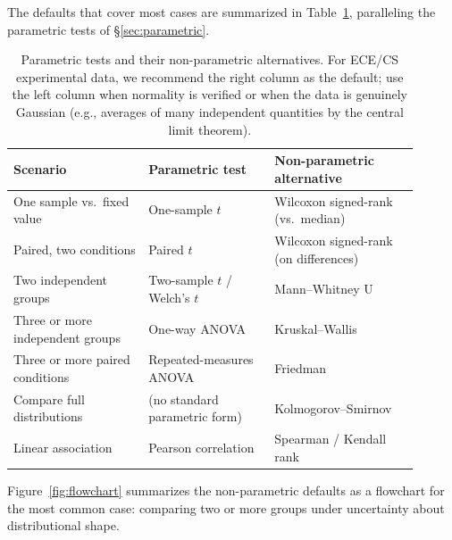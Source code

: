 \documentclass[11pt]{article}
\begin{document}
The defaults that cover most cases are summarized in Table~\ref{tab:tests}, paralleling the parametric tests of \S\ref{sec:parametric}.

\begin{table}[h]
\centering
\footnotesize
\setlength{\tabcolsep}{4pt}
\begin{tabular}{p{0.30\linewidth}p{0.28\linewidth}p{0.32\linewidth}}
\toprule
Scenario & Parametric test & Non-parametric alternative \\
\midrule
One sample vs.\ fixed value & One-sample $t$ & Wilcoxon signed-rank (vs.\ median) \\
Paired, two conditions & Paired $t$ & Wilcoxon signed-rank (on differences) \\
Two independent groups & Two-sample $t$ / Welch's $t$ & Mann--Whitney U \\
Three or more independent groups & One-way ANOVA & Kruskal--Wallis \\
Three or more paired conditions & Repeated-measures ANOVA & Friedman \\
Compare full distributions & (no standard parametric form) & Kolmogorov--Smirnov \\
Linear association & Pearson correlation & Spearman / Kendall rank \\
\bottomrule
\end{tabular}
\caption{Parametric tests and their non-parametric alternatives. For ECE/CS experimental data, we recommend the right column as the default; use the left column when normality is verified or when the data is genuinely Gaussian (e.g., averages of many independent quantities by the central limit theorem).}
\label{tab:tests}
\end{table}

Figure~\ref{fig:flowchart} summarizes the non-parametric defaults as a flowchart for the most common case: comparing two or more groups under uncertainty about distributional shape.
\end{document}
